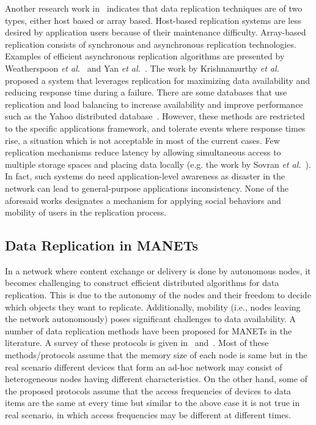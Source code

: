 Another research work in~\cite{ANatanzon2013} indicates that data replication techniques are of two types, either host based or array based. Host-based replication systems are less desired by application users because of their maintenance difficulty. Array-based replication consists of synchronous and asynchronous replication technologies. Examples of efficient asynchronous replication algorithms are presented by Weatherspoon {\it et al.}~\cite{HWeatherspoon2009} and Yan {\it et al.}~\cite{RYan2004}. The work by Krishnamurthy {\it et al.}~\cite{SKrishnamurthy2003} proposed a system that leverages replication for maximizing data availability and reducing response time during a failure. There are some databases that use replication and load balancing to increase availability and improve performance such as the Yahoo distributed database~\cite{BFCooper2008}. However, these methods are restricted to the specific applications framework, and tolerate events where response times rise, a situation which is not acceptable in most of the current cases. Few replication mechanisms reduce latency by allowing simultaneous access to multiple storage spaces and placing data locally (e.g. the work by Sovran {\it et al.}~\cite{YSovran2011}). In fact, such systems do need application-level awareness as disaster in the network can lead to general-purpose applications inconsistency. None of the aforesaid works designates a mechanism for applying social behaviors and mobility of users in the replication process.

\subsection{Data Replication in MANETs}\label{Chap2_04_02}
In a network where content exchange or delivery is done by autonomous nodes, it becomes challenging to construct efficient distributed algorithms for data replication. This is due to the autonomy of the nodes and their freedom to decide which objects they want to replicate. Additionally, mobility (i.e., nodes leaving the network autonomously) poses significant challenges to data availability. A number of data replication methods have been proposed for MANETs in the literature. A survey of these protocols is given in~\cite{ADerhab2009} and~\cite{PPadmanabhan2008}. Most of these methods/protocols assume that the memory size of each node is same but in the real scenario different devices that form an ad-hoc network may consist of heterogeneous nodes having different characteristics. On the other hand, some of the proposed protocols assume that the access frequencies of devices to data items are the same at every time but similar to the above case it is not true in real scenario, in which access frequencies may be different at different times.

